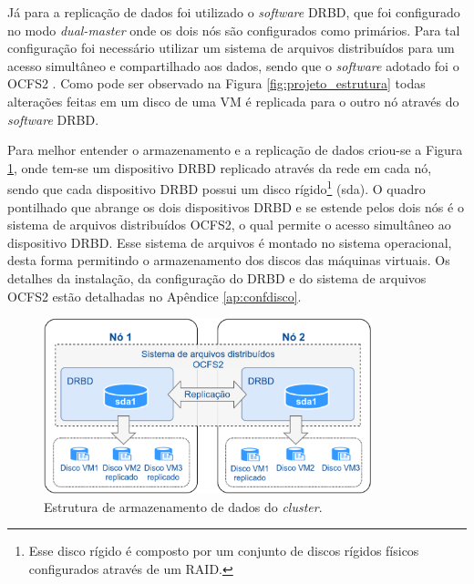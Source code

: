 Já para a replicação de dados foi utilizado o \textit{software} \ac{DRBD}, que foi configurado no modo \textit{dual-master} onde os dois nós 
são configurados como primários. Para tal configuração foi necessário utilizar um sistema de arquivos distribuídos para um acesso 
simultâneo e compartilhado aos dados, sendo que o \textit{software} adotado foi o \ac{OCFS2} \cite{ocfs2}. 
Como pode ser observado na Figura \ref{fig:projeto_estrutura} todas alterações feitas em um disco de uma \ac{VM} é replicada para o 
outro nó através do \textit{software} \ac{DRBD}. 

Para melhor entender o armazenamento e a replicação de dados criou-se a Figura \ref{fig:projeto_discos}, onde tem-se um dispositivo \ac{DRBD}
replicado através da rede em cada nó, sendo que cada dispositivo \ac{DRBD} possui um disco rígido\footnote[1]{Esse disco rígido é composto
por um conjunto de discos rígidos físicos configurados através de um \ac{RAID}.} (sda). O quadro pontilhado que abrange os dois dispositivos
\ac{DRBD} e se estende pelos dois nós é o sistema de arquivos distribuídos \ac{OCFS2}, o qual permite o acesso simultâneo ao dispositivo \ac{DRBD}.
Esse sistema de arquivos é montado no sistema operacional, desta forma permitindo o armazenamento dos discos das máquinas virtuais.
Os detalhes da instalação, da configuração do \ac{DRBD} e do sistema de arquivos \ac{OCFS2} estão detalhadas no Apêndice \ref{ap:confdisco}. 

\begin{figure}[h!]
 \centering
 \includegraphics[width=360px]{img/projeto_discos.eps}
 \caption{Estrutura de armazenamento de dados do \textit{cluster}.}
 \label{fig:projeto_discos}
\end{figure}



